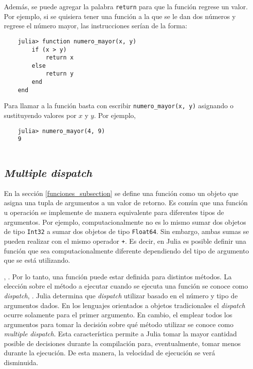 Además, se puede agregar la palabra \texttt{return} para que la función regrese un valor. Por ejemplo, si se quisiera tener una función a la que se le dan dos números y regrese el número mayor, las instrucciones serían de la forma:

\begin{verbatim}
	julia> function numero_mayor(x, y)
		if (x > y)
			return x
		else
			return y
		end
	end
\end{verbatim}


Para llamar a la función basta con escribir \texttt{numero\_mayor(x, y)} asignando o sustituyendo valores por $x$ y $y$. Por ejemplo,

\begin{verbatim}
	julia> numero_mayor(4, 9)
	9
	
\end{verbatim}

\subsection{\textit{Multiple dispatch}} \label{subMultipleDispatch}
En la sección \ref{funciones_subsection} se define una función como un objeto que asigna una tupla de argumentos a un valor de retorno. Es común que una función u operación se implemente de manera equivalente para diferentes tipos de argumentos. Por ejemplo, computacionalmente no es lo mismo sumar dos objetos de tipo \texttt{Int32} a sumar dos objetos de tipo \texttt{Float64}. Sin embargo, ambas sumas se pueden realizar con el mismo operador \texttt{+}. Es decir, en \textsf{Julia} es posible definir una función que sea computacionalmente diferente dependiendo del tipo de argumento que se está utilizando.

, \cite{manual_Julia}. Por lo tanto, una función puede estar definida para distintos métodos. La elección sobre el método a ejecutar cuando se ejecuta una función se conoce como \textit{dispatch}, \cite{manual_Julia}. \textsf{Julia} determina que \textit{dispatch} utilizar basado en el número y tipo de argumentos dados. En los lenguajes orientados a objetos tradicionales el \textit{dispatch} ocurre solamente para el primer argumento. En cambio, el emplear todos los argumentos para tomar la decisión sobre qué método utilizar se conoce como \textit{multiple dispatch}. Esta característica permite a \textsf{Julia} tomar la mayor cantidad posible de decisiones durante la compilación para, eventualmente, tomar menos durante la ejecución. De esta manera, la velocidad de ejecución se verá disminuida. 

